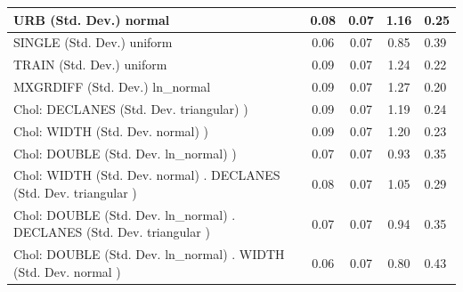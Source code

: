 \begin{table}
\begin{center}
\begin{tabular}{|l|l|c|c|c|l|}
			\hline
			URB (Std. Dev.) normal &  & 0.08 & 0.07 & 1.16 & 0.25 \\
			\hline
			SINGLE (Std. Dev.) uniform &  & 0.06 & 0.07 & 0.85 & 0.39 \\
			\hline
			TRAIN (Std. Dev.) uniform &  & 0.09 & 0.07 & 1.24 & 0.22 \\
			\hline
			MXGRDIFF (Std. Dev.) ln_normal &  & 0.09 & 0.07 & 1.27 & 0.20 \\
			\hline
			 Chol: DECLANES (Std. Dev. triangular) ) &  & 0.09 & 0.07 & 1.19 & 0.24 \\
			\hline
			 Chol: WIDTH (Std. Dev. normal) ) &  & 0.09 & 0.07 & 1.20 & 0.23 \\
			\hline
			 Chol: DOUBLE (Std. Dev. ln_normal) ) &  & 0.07 & 0.07 & 0.93 & 0.35 \\
			\hline
			 Chol: WIDTH (Std. Dev. normal) . DECLANES (Std. Dev.   triangular ) &  & 0.08 & 0.07 & 1.05 & 0.29 \\
			\hline
			 Chol: DOUBLE (Std. Dev. ln_normal) . DECLANES (Std. Dev.   triangular ) &  & 0.07 & 0.07 & 0.94 & 0.35 \\
			\hline
			 Chol: DOUBLE (Std. Dev. ln_normal) . WIDTH (Std. Dev.   normal ) &  & 0.06 & 0.07 & 0.80 & 0.43 \\
			\hline
		\end{tabular}
	\end{center}
\end{table}